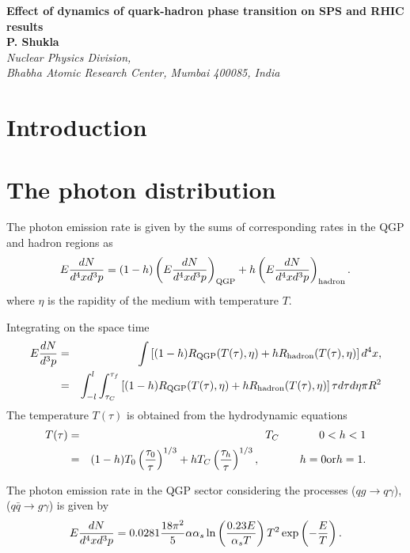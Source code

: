 \textwidth=15cm
\textheight=22cm
\pagestyle{empty}


\begin{center}
{\large \bf Effect of dynamics of quark-hadron phase transition
            on SPS and RHIC results}\\
{\bf P. Shukla}\\
{\it Nuclear Physics Division,\\
 Bhabha Atomic Research Center, Mumbai 400085, India}
\end{center}


\section{Introduction}

\section{The photon distribution}
  The photon emission rate is given by the sums of corresponding 
rates in the QGP and hadron regions as 
\begin{eqnarray}\label{}
E {dN \over d^4x d^3p} = 
 (1-h) \left(E {dN \over d^4x d^3p}\right)_{\rm QGP} +
  h  \left(E {dN \over d^4x d^3p}\right)_{\rm hadron}.
\end{eqnarray}
where $\eta$ is the rapidity of the medium with temperature $T$.

Integrating on the space time
\begin{eqnarray}\label{}
E {dN \over d^3p} &=& \int \left[(1-h) R_{\rm QGP} (T(\tau),\eta)+ 
     h  R_{\rm hadron}(T(\tau),\eta) \right] d^4 x, \nonumber \\
   &=& \int_{-l}^{l} \int_{\tau_C}^{\tau_f}
      \left[(1-h) R_{\rm QGP}(T(\tau),\eta) 
   + h  R_{\rm hadron}(T(\tau),\eta) \right]\tau d\tau d\eta \pi R^2
\end{eqnarray}
The temperature $T(\tau)$ is obtained from the hydrodynamic equations
\begin{eqnarray}\label{}
T(\tau)  &=& T_C  \hspace{.5in} 0 < h < 1   \nonumber \\
      &=& (1-h) T_0 \left({\tau_0 \over \tau}\right)^{1/3}
        + h T_C \left({\tau_h \over \tau}\right)^{1/3},
           \hspace{.5in} h=0 {\rm or}  h = 1.
\end{eqnarray}

 The photon emission rate in the QGP sector considering 
the processes ($qg\rightarrow q\gamma$),
($q \bar q \rightarrow g \gamma$)
is given by 
\begin{eqnarray}\label{}
E {dN \over d^4x d^3p} = 0.0281 {18\pi^2\over 5} \alpha \alpha_s 
         \ln\left({0.23 E \over \alpha_s T} \right) T^2 
         \exp\left(-\frac{E}{T}\right).
\end{eqnarray}

